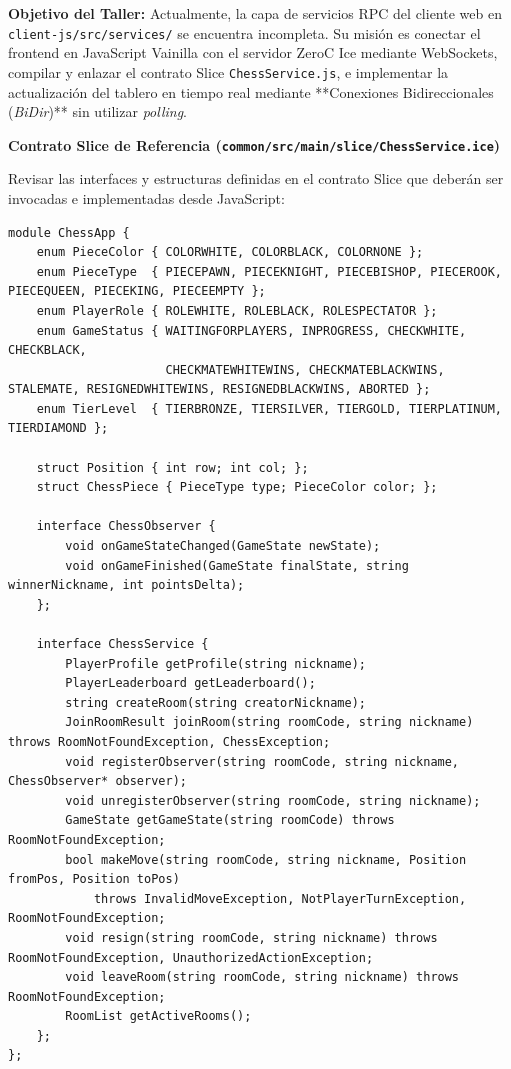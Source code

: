 \documentclass[10pt,letterpaper]{article}
\newcommand{\sectionBadge}[1]{%
  \refstepcounter{section}%
  \vspace{0.24cm}%
  \noindent%
  \colorbox{icesiBlue}{\color{white}\rule[-0.08cm]{0pt}{0.42cm}\hspace{0.16cm}\textbf{\normalsize \thesection}\hspace{0.16cm}}%
  \hspace{0.18cm}%
  {\fontsize{9.5}{12}\selectfont\textbf{\color{icesiDark}#1}}\\[-0.10cm]%
  \noindent{\color{icesiDark}\rule{\textwidth}{0.8pt}}\vspace{0.10cm}%
}
\begin{document}
\noindent
\textbf{Objetivo del Taller:} Actualmente, la capa de servicios RPC del cliente web en \texttt{client-js/src/services/} se encuentra incompleta. Su misión es conectar el frontend en JavaScript Vainilla con el servidor ZeroC Ice mediante WebSockets, compilar y enlazar el contrato Slice \texttt{ChessService.js}, e implementar la actualización del tablero en tiempo real mediante **Conexiones Bidireccionales (\textit{BiDir})** sin utilizar \textit{polling}.

\sectionBadge{Contrato Slice de Referencia (\texttt{common/src/main/slice/ChessService.ice})}

Revisar las interfaces y estructuras definidas en el contrato Slice que deberán ser invocadas e implementadas desde JavaScript:

\begin{lstlisting}[style=slicestyle]
module ChessApp {
    enum PieceColor { COLORWHITE, COLORBLACK, COLORNONE };
    enum PieceType  { PIECEPAWN, PIECEKNIGHT, PIECEBISHOP, PIECEROOK, PIECEQUEEN, PIECEKING, PIECEEMPTY };
    enum PlayerRole { ROLEWHITE, ROLEBLACK, ROLESPECTATOR };
    enum GameStatus { WAITINGFORPLAYERS, INPROGRESS, CHECKWHITE, CHECKBLACK,
                      CHECKMATEWHITEWINS, CHECKMATEBLACKWINS, STALEMATE, RESIGNEDWHITEWINS, RESIGNEDBLACKWINS, ABORTED };
    enum TierLevel  { TIERBRONZE, TIERSILVER, TIERGOLD, TIERPLATINUM, TIERDIAMOND };

    struct Position { int row; int col; };
    struct ChessPiece { PieceType type; PieceColor color; };

    interface ChessObserver {
        void onGameStateChanged(GameState newState);
        void onGameFinished(GameState finalState, string winnerNickname, int pointsDelta);
    };

    interface ChessService {
        PlayerProfile getProfile(string nickname);
        PlayerLeaderboard getLeaderboard();
        string createRoom(string creatorNickname);
        JoinRoomResult joinRoom(string roomCode, string nickname) throws RoomNotFoundException, ChessException;
        void registerObserver(string roomCode, string nickname, ChessObserver* observer);
        void unregisterObserver(string roomCode, string nickname);
        GameState getGameState(string roomCode) throws RoomNotFoundException;
        bool makeMove(string roomCode, string nickname, Position fromPos, Position toPos)
            throws InvalidMoveException, NotPlayerTurnException, RoomNotFoundException;
        void resign(string roomCode, string nickname) throws RoomNotFoundException, UnauthorizedActionException;
        void leaveRoom(string roomCode, string nickname) throws RoomNotFoundException;
        RoomList getActiveRooms();
    };
};
\end{lstlisting}
\end{document}
